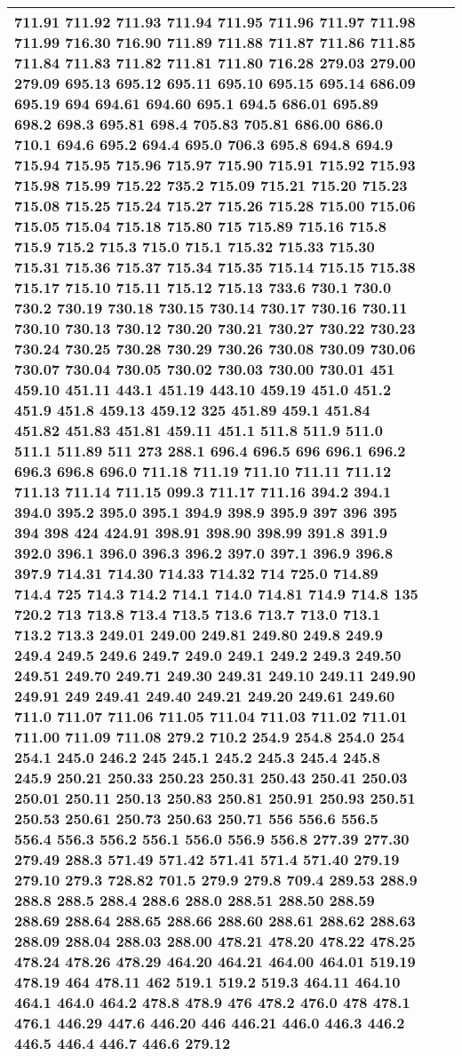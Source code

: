 \begin{longtable}{|R{.05in}|L{.65in}||L{5.65in}|}
711.91 711.92 711.93 711.94 711.95 711.96 711.97 711.98 711.99 716.30 716.90 711.89 711.88 711.87 711.86 711.85 711.84 711.83 711.82 711.81 711.80 716.28 279.03 279.00 279.09 695.13 695.12 695.11 695.10 695.15 695.14 686.09 695.19 694 694.61 694.60 695.1 694.5 686.01 695.89 698.2 698.3 695.81 698.4 705.83 705.81 686.00 686.0 710.1 694.6 695.2 694.4 695.0 706.3 695.8 694.8 694.9 715.94 715.95 715.96 715.97 715.90 715.91 715.92 715.93 715.98 715.99 715.22 735.2 715.09 715.21 715.20 715.23 715.08 715.25 715.24 715.27 715.26 715.28 715.00 715.06 715.05 715.04 715.18 715.80 715 715.89 715.16 715.8 715.9 715.2 715.3 715.0 715.1 715.32 715.33 715.30 715.31 715.36 715.37 715.34 715.35 715.14 715.15 715.38 715.17 715.10 715.11 715.12 715.13 733.6 730.1 730.0 730.2 730.19 730.18 730.15 730.14 730.17 730.16 730.11 730.10 730.13 730.12 730.20 730.21 730.27 730.22 730.23 730.24 730.25 730.28 730.29 730.26 730.08 730.09 730.06 730.07 730.04 730.05 730.02 730.03 730.00 730.01 451 459.10 451.11 443.1 451.19 443.10 459.19 451.0 451.2 451.9 451.8 459.13 459.12 325 451.89 459.1 451.84 451.82 451.83 451.81 459.11 451.1 511.8 511.9 511.0 511.1 511.89 511 273 288.1 696.4 696.5 696 696.1 696.2 696.3 696.8 696.0 711.18 711.19 711.10 711.11 711.12 711.13 711.14 711.15 099.3 711.17 711.16 394.2 394.1 394.0 395.2 395.0 395.1 394.9 398.9 395.9 397 396 395 394 398 424 424.91 398.91 398.90 398.99 391.8 391.9 392.0 396.1 396.0 396.3 396.2 397.0 397.1 396.9 396.8 397.9 714.31 714.30 714.33 714.32 714 725.0 714.89 714.4 725 714.3 714.2 714.1 714.0 714.81 714.9 714.8 135 720.2 713 713.8 713.4 713.5 713.6 713.7 713.0 713.1 713.2 713.3 249.01 249.00 249.81 249.80 249.8 249.9 249.4 249.5 249.6 249.7 249.0 249.1 249.2 249.3 249.50 249.51 249.70 249.71 249.30 249.31 249.10 249.11 249.90 249.91 249 249.41 249.40 249.21 249.20 249.61 249.60 711.0 711.07 711.06 711.05 711.04 711.03 711.02 711.01 711.00 711.09 711.08 279.2 710.2 254.9 254.8 254.0 254 254.1 245.0 246.2 245 245.1 245.2 245.3 245.4 245.8 245.9 250.21 250.33 250.23 250.31 250.43 250.41 250.03 250.01 250.11 250.13 250.83 250.81 250.91 250.93 250.51 250.53 250.61 250.73 250.63 250.71 556 556.6 556.5 556.4 556.3 556.2 556.1 556.0 556.9 556.8 277.39 277.30 279.49 288.3 571.49 571.42 571.41 571.4 571.40 279.19 279.10 279.3 728.82 701.5 279.9 279.8 709.4 289.53 288.9 288.8 288.5 288.4 288.6 288.0 288.51 288.50 288.59 288.69 288.64 288.65 288.66 288.60 288.61 288.62 288.63 288.09 288.04 288.03 288.00 478.21 478.20 478.22 478.25 478.24 478.26 478.29 464.20 464.21 464.00 464.01 519.19 478.19 464 478.11 462 519.1 519.2 519.3 464.11 464.10 464.1 464.0 464.2 478.8 478.9 476 478.2 476.0 478 478.1 476.1 446.29 447.6 446.20 446 446.21 446.0 446.3 446.2 446.5 446.4 446.7 446.6 279.12\\\hline

\end{longtable}
